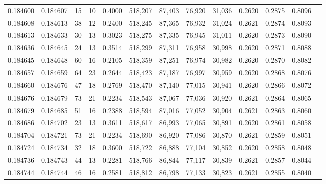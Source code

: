\begin{tabular}{rrrrrrrrrrrrr}
0.184600 & 0.184607 &    15 &  10 &                                     0.4000 & 518,207 &  87,403 &  76,920 &  31,036 & 0.2620 & 0.2875 & 0.8096 \\
0.184608 & 0.184613 &    38 &  12 &                                     0.2400 & 518,245 &  87,365 &  76,932 &  31,024 & 0.2621 & 0.2874 & 0.8093 \\
0.184613 & 0.184633 &    30 &  13 &                                     0.3023 & 518,275 &  87,335 &  76,945 &  31,011 & 0.2620 & 0.2873 & 0.8090 \\
0.184636 & 0.184645 &    24 &  13 &                                     0.3514 & 518,299 &  87,311 &  76,958 &  30,998 & 0.2620 & 0.2871 & 0.8088 \\
0.184645 & 0.184648 &    60 &  16 &                                     0.2105 & 518,359 &  87,251 &  76,974 &  30,982 & 0.2620 & 0.2870 & 0.8082 \\
0.184657 & 0.184659 &    64 &  23 &                                     0.2644 & 518,423 &  87,187 &  76,997 &  30,959 & 0.2620 & 0.2868 & 0.8076 \\
0.184660 & 0.184676 &    47 &  18 &                                     0.2769 & 518,470 &  87,140 &  77,015 &  30,941 & 0.2620 & 0.2866 & 0.8072 \\
0.184676 & 0.184679 &    73 &  21 &                                     0.2234 & 518,543 &  87,067 &  77,036 &  30,920 & 0.2621 & 0.2864 & 0.8065 \\
0.184679 & 0.184685 &    51 &  16 &                                     0.2388 & 518,594 &  87,016 &  77,052 &  30,904 & 0.2621 & 0.2863 & 0.8060 \\
0.184686 & 0.184702 &    23 &  13 &                                     0.3611 & 518,617 &  86,993 &  77,065 &  30,891 & 0.2620 & 0.2861 & 0.8058 \\
0.184704 & 0.184721 &    73 &  21 &                                     0.2234 & 518,690 &  86,920 &  77,086 &  30,870 & 0.2621 & 0.2859 & 0.8051 \\
0.184724 & 0.184734 &    32 &  18 &                                     0.3600 & 518,722 &  86,888 &  77,104 &  30,852 & 0.2620 & 0.2858 & 0.8048 \\
0.184736 & 0.184743 &    44 &  13 &                                     0.2281 & 518,766 &  86,844 &  77,117 &  30,839 & 0.2621 & 0.2857 & 0.8044 \\
0.184744 & 0.184744 &    46 &  16 &                                     0.2581 & 518,812 &  86,798 &  77,133 &  30,823 & 0.2621 & 0.2855 & 0.8040 \\

\end{tabular}
